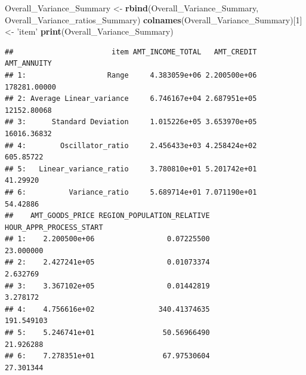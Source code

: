 \documentclass[]{article}
\newenvironment{Shaded}{\begin{snugshade}}{\end{snugshade}}
\newcommand{\KeywordTok}[1]{\textcolor[rgb]{0.13,0.29,0.53}{\textbf{#1}}}
\newcommand{\DecValTok}[1]{\textcolor[rgb]{0.00,0.00,0.81}{#1}}
\newcommand{\StringTok}[1]{\textcolor[rgb]{0.31,0.60,0.02}{#1}}
\newcommand{\NormalTok}[1]{#1}
\begin{document}
\begin{Shaded}
\begin{Highlighting}[]
\NormalTok{Overall_Variance_Summary <-}\StringTok{ }\KeywordTok{rbind}\NormalTok{(Overall_Variance_Summary, Overall_Variance_ratios_Summary)}
\KeywordTok{colnames}\NormalTok{(Overall_Variance_Summary)[}\DecValTok{1}\NormalTok{] <-}\StringTok{ 'item'}
\KeywordTok{print}\NormalTok{(Overall_Variance_Summary)}
\end{Highlighting}
\end{Shaded}

\begin{verbatim}
##                       item AMT_INCOME_TOTAL   AMT_CREDIT  AMT_ANNUITY
## 1:                   Range     4.383059e+06 2.200500e+06 178281.00000
## 2: Average Linear_variance     6.746167e+04 2.687951e+05  12152.80068
## 3:      Standard Deviation     1.015226e+05 3.653970e+05  16016.36832
## 4:        Oscillator_ratio     2.456433e+03 4.258424e+02    605.85722
## 5:   Linear_variance_ratio     3.780810e+01 5.201742e+01     41.29920
## 6:          Variance_ratio     5.689714e+01 7.071190e+01     54.42886
##    AMT_GOODS_PRICE REGION_POPULATION_RELATIVE HOUR_APPR_PROCESS_START
## 1:    2.200500e+06                 0.07225500               23.000000
## 2:    2.427241e+05                 0.01073374                2.632769
## 3:    3.367102e+05                 0.01442819                3.278172
## 4:    4.756616e+02               340.41374635              191.549103
## 5:    5.246741e+01                50.56966490               21.926288
## 6:    7.278351e+01                67.97530604               27.301344
\end{verbatim}
\end{document}
